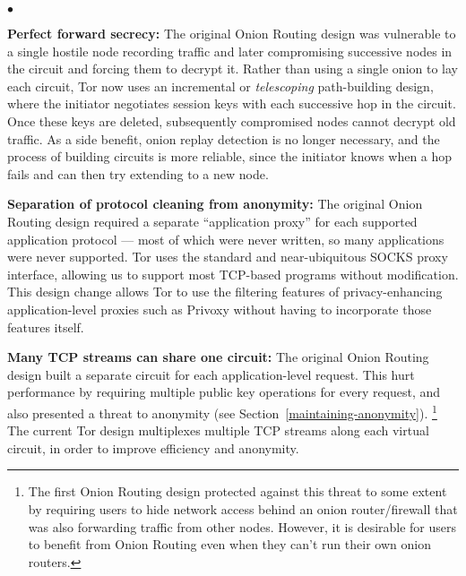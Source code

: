 \documentclass[times,10pt,twocolumn]{article}
\newenvironment{tightlist}{\begin{list}{$\bullet$}{
  \setlength{\itemsep}{0mm}
    \setlength{\parsep}{0mm}
    }}{\end{list}}
\begin{document}
\begin{tightlist}

\item \textbf{Perfect forward secrecy:} The original Onion Routing
design was vulnerable to a single hostile node recording traffic and later
compromising successive nodes in the circuit and forcing them to
decrypt it. 
Rather than using a single onion to lay each circuit,
Tor now uses an incremental or \emph{telescoping}
path-building design, where the initiator negotiates session keys with
each successive hop in the circuit.  Once these keys are deleted,
subsequently compromised nodes cannot decrypt old traffic.
As a side benefit, onion replay detection is no longer
necessary, and the process of building circuits is more reliable, since
the initiator knows when a hop fails and can then try extending to a new node.


\item \textbf{Separation of protocol cleaning from anonymity:}
The original Onion Routing design required a separate ``application
proxy'' for each
supported application protocol --- most
of which were never written, so many applications were never supported.
Tor uses the standard and near-ubiquitous SOCKS
\cite{socks4,socks5} proxy interface, allowing us to support most TCP-based
programs without modification.  This design change allows Tor to
use the filtering features of privacy-enhancing
application-level proxies such as Privoxy without having to
incorporate those features itself.

\item \textbf{Many TCP streams can share one circuit:} The original
Onion Routing design built a separate circuit for each application-level
request.
This hurt performance by requiring multiple public key operations for
every request, and also presented
a threat to anonymity (see Section~\ref{maintaining-anonymity}).
\footnote{The first Onion Routing design \cite{or-ih96} protected against
this threat to some
extent by requiring users to hide network access behind an onion
router/firewall that was also forwarding traffic from other nodes.
However, it is desirable for users to
benefit from Onion Routing even when they can't run their own 
onion routers.
%
}
The current Tor design multiplexes multiple TCP streams along each virtual
circuit, in order to improve efficiency and anonymity.


\end{tightlist}
\end{document}
